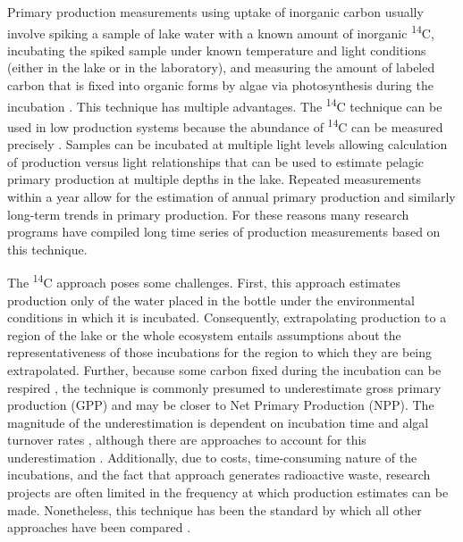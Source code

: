 \documentclass[12pt, oneside]{article}
\begin{document}
Primary production measurements using uptake of inorganic carbon usually involve spiking a sample of lake water with a known amount of inorganic \textsuperscript{14}C, incubating the spiked sample under known temperature and light conditions (either in the lake or in the laboratory), and measuring the amount of labeled carbon that is fixed into organic forms by algae via photosynthesis during the incubation \citep{Fee_1973,peterson_aquatic_1980}.  This technique has multiple advantages.  The \textsuperscript{14}C technique can be used in low production systems because the abundance of \textsuperscript{14}C can be measured precisely \citep{hall_measuring_2007}.  Samples can be incubated at multiple light levels allowing calculation of production versus light relationships that can be used to estimate pelagic primary production at multiple depths in the lake.  Repeated measurements within a year allow for the estimation of annual primary production and similarly long-term trends in primary production.  For these reasons many research programs have compiled long time series of production measurements based on this technique.

The \textsuperscript{14}C approach poses some challenges. First, this approach estimates production only of the water placed in the bottle under the environmental conditions in which it is incubated. Consequently, extrapolating production to a region of the lake or the whole ecosystem entails assumptions about the representativeness of those incubations for the region to which they are being extrapolated. Further, because some carbon fixed during the incubation can be respired \citep{Vollenweider_Talling_Westlake_1974, peterson_aquatic_1980}, the technique is commonly presumed to underestimate gross primary production (GPP) and may be closer to Net Primary Production (NPP). The magnitude of the underestimation is dependent on incubation time and algal turnover rates \citep{hall_measuring_2007}, although there are approaches to account for this underestimation \citep{Legendre_Demers_Yentsch_Yentsch_1983}. Additionally, due to costs, time-consuming nature of the incubations, and the  fact that approach generates radioactive waste, research projects are often limited in the frequency at which production estimates can be made. Nonetheless, this technique has been the standard by which all other approaches have been compared \citep{peterson_aquatic_1980}.
\end{document}
